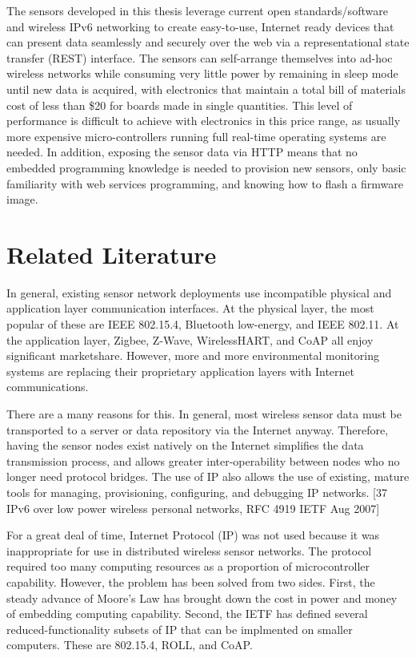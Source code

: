 The sensors developed in this thesis leverage current open standards/software and wireless IPv6 networking to create easy-to-use, Internet ready devices that can present data seamlessly and securely over the web via a representational state transfer (REST)\cite{fielding2002principled} interface. The sensors can self-arrange themselves into ad-hoc wireless networks while consuming very little power by remaining in sleep mode until new data is acquired, with electronics that maintain a total bill of materials  cost of less than \$20 for boards made in single quantities. This level of performance is difficult to achieve with electronics in this price range, as usually more expensive micro-controllers running full real-time operating systems are needed. In addition, exposing the sensor data via HTTP means that no embedded programming knowledge is needed to provision new sensors, only basic familiarity with web services programming, and knowing how to flash a firmware image.

\section{Related Literature}

In general, existing sensor network deployments use incompatible physical and application layer communication interfaces. At the physical layer, the most popular of these are IEEE 802.15.4, Bluetooth low-energy, and IEEE 802.11. At the application layer, Zigbee, Z-Wave, WirelessHART, and CoAP all enjoy significant marketshare. However, more and more environmental monitoring systems are replacing their proprietary application layers with Internet communications.

There are a many reasons for this. In general, most wireless sensor data must be transported to a server or data repository via the Internet anyway. Therefore, having the sensor nodes exist natively on the Internet simplifies the data transmission process, and allows greater inter-operability between nodes who no longer need protocol bridges. The use of IP also allows the use of existing, mature tools for managing, provisioning, configuring, and debugging IP networks.  [37 IPv6 over low power wireless personal networks, RFC 4919 IETF Aug 2007]

For a great deal of time, Internet Protocol (IP) was not used because it was inappropriate for use in distributed wireless sensor networks. The protocol required too many computing resources as a proportion of microcontroller capability. However, the problem has been solved from two sides. First, the steady advance of Moore's Law has brought down the cost in power and money of embedding computing capability. Second, the IETF has defined several reduced-functionality subsets of IP that can be implmented on smaller computers. These are 802.15.4, ROLL, and CoAP. 


